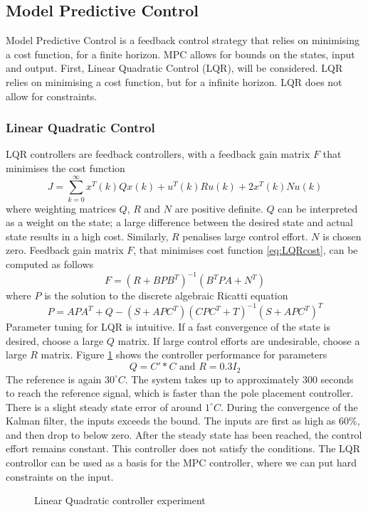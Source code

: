 \subsection{Model Predictive Control}
Model Predictive Control is a feedback control strategy that relies on minimising a cost function, for a finite horizon. MPC allows for bounds on the states, input and output. First, Linear Quadratic Control (LQR), will be considered. LQR relies on minimising a cost function, but for a infinite horizon. LQR does not allow for constraints.

\subsubsection{Linear Quadratic Control}
LQR controllers are feedback controllers, with a feedback gain matrix $F$ that minimises the cost function
\begin{equation}
    J = \sum_{k=0}^{\infty} x^T(k)Qx(k) + u^T(k)Ru(k) + 2x^T(k)Nu(k) \label{eq:LQRcost}
\end{equation}
where weighting matrices $Q$, $R$ and $N$ are positive definite. $Q$ can be interpreted as a weight on the state; a large difference between the desired state and actual state results in a high cost. Similarly, $R$ penalises large control effort. $N$ is chosen zero.
Feedback gain matrix $F$, that minimises cost function \ref{eq:LQRcost}, can be computed as follows
$$
F = (R+BPB^T)^{-1}(B^TPA+N^T)
$$
where $P$ is the solution to the discrete algebraic Ricatti equation
\begin{equation}
P = APA^T + Q - (S+APC^T)(CPC^T+T)^{-1}(S+APC^T)^T \label{eq:LQRricatti}
\end{equation}
Parameter tuning for LQR is intuitive. If a fast convergence of the state is desired, choose a large $Q$ matrix. If large control efforts are undesirable, choose a large $R$ matrix. Figure \ref{fig:LQR1} shows the controller performance for parameters
$$
Q = C'*C \text{ and } R = 0.3I_2
$$
The reference is again $30^{\circ}C$. The system takes up to approximately 300 seconds to reach the reference signal, which is faster than the pole placement controller. There is a slight steady state error of around  $1^{\circ}C$. During the convergence of the Kalman filter, the inputs exceeds the bound. The inputs are first as high as 60\%, and then drop to below zero. After the steady state has been reached, the control effort remains constant. This controller does not satisfy the conditions. The LQR controllor can be used as a basis for the MPC controller, where we can put hard constraints on the input.
\begin{figure}
    \centering
    
    \caption{Linear Quadratic controller experiment}
    \label{fig:LQR1}
\end{figure}

